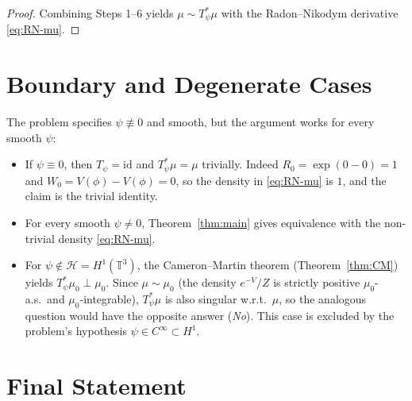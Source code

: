 \documentclass[12pt]{article}
\theoremstyle{definition}
\begin{document}
\begin{proof}
Combining Steps 1--6 yields $\mu\sim T_\psi^*\mu$ with the Radon--Nikodym derivative
\eqref{eq:RN-mu}.
\end{proof}

\section{Boundary and Degenerate Cases}

The problem specifies $\psi\not\equiv 0$ and smooth, but the argument works for every
smooth $\psi$:

\begin{itemize}
\item If $\psi\equiv0$, then $T_\psi=\mathrm{id}$ and $T_\psi^*\mu=\mu$ trivially. Indeed
$R_0=\exp(0-0)=1$ and $W_0=V(\phi)-V(\phi)=0$, so the density in \eqref{eq:RN-mu} is $1$,
and the claim is the trivial identity.
\item For every smooth $\psi\ne 0$, Theorem~\ref{thm:main} gives equivalence with the
non-trivial density \eqref{eq:RN-mu}.
\item For $\psi\notin\mathcal{H}=H^1(\mathbb{T}^3)$, the Cameron--Martin theorem
(Theorem~\ref{thm:CM}) yields $T_\psi^*\mu_0\perp\mu_0$. Since $\mu\sim\mu_0$ (the density
$e^{-V}/Z$ is strictly positive $\mu_0$-a.s.\ and $\mu_0$-integrable), $T_\psi^*\mu$ is
also singular w.r.t.\ $\mu$, so the
analogous question would have the opposite answer (\emph{No}). This case is excluded by the
problem's hypothesis $\psi\in C^\infty\subset H^1$.
\end{itemize}

\section{Final Statement}
\end{document}
